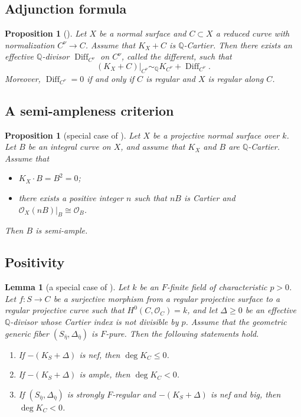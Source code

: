 \documentclass[10pt,abstract=true]{scrartcl}
\numberwithin{equation}{section}
\newtheorem{lemma}[theorem]{Lemma}
\newtheorem{proposition}[theorem]{Proposition}
\theoremstyle{definition}
\theoremstyle{remark}
\def\simQ{\sim_{\mathbb Q}} \def\geQ{\ge_{\mathbb Q}}
\begin{document}
\subsection{Adjunction formula}\label{sec:adjunction}%
\begin{proposition}[{\cite[Definition~2.34 and Proposition~2.35]{Kollar-Sing}}]\label{prop:adj}%
  Let $X$ be a normal surface and $C\subset X$ a reduced curve with normalization $C^\nu\to C$.
  Assume that $K_X + C$ is $\mathbb Q$-Cartier.
  Then there exists an effective $\mathbb Q$-divisor $\operatorname{Diff}_{C^\nu}$ on $C^\nu$, called the different, such that \[
        (K_X + C)|_{C^\nu} \simQ K_{C^\nu} + \operatorname{Diff}_{C^\nu}.
      \]
  Moreover, $\operatorname{Diff}_{C^\nu} = 0$ if and only if $C$ is regular and $X$ is regular along $C$.
\end{proposition}

\subsection{A semi-ampleness criterion}\label{sec:semi-ampleness}
\begin{proposition}[special case of {\cite[Proposition~3.1]{tanaka_abundance_2020}}]\label{prop:tanaka-abun-3.1}%
  Let $X$ be a projective normal surface over $k$.
  Let $B$ be an integral curve on $X$, and assume that $K_X$ and $B$ are $\mathbb Q$-Cartier.
  Assume that
  \begin{itemize}
    \item[\textup{(1)}] $K_X \cdot B = B^2 = 0$;
    \item[\textup{(2)}] there exists a positive integer $n$ such that $nB$ is Cartier and $\mathcal O_X(nB)|_B\cong\mathcal O_B$.
  \end{itemize}
  Then $B$ is semi-ample.
\end{proposition}


\subsection{Positivity}\label{sec:positivity}
\begin{lemma}[a special case of {\cite[Corollary~4.6]{Ejiri-2019}}]\label{lemm:Ejiri-base-curve}
  Let $k$ be an $F$-finite field of characteristic $p>0$.
  Let $f\colon S\to C$ be a surjective morphism from a regular projective surface to a regular projective curve such that $H^0(C,\mathcal O_C)=k$, and let $\Delta\ge0$ be an effective $\mathbb Q$-divisor whose Cartier index is not divisible by $p$.
  Assume that the geometric generic fiber $(S_{\bar\eta},\Delta_{\bar\eta})$ is $F$-pure.
  Then the following statements hold.
  \begin{enumerate}[label=\textup{(\arabic*)}]
    \item If $-(K_S+\Delta)$ is nef, then $\deg K_C \leq 0$.
    \item If $-(K_S+\Delta)$ is ample, then $\deg K_C < 0$.
    \item If $(S_{\bar\eta},\Delta_{\bar\eta})$ is strongly $F$-regular and $-(K_S+\Delta)$ is nef and big, then $\deg K_C < 0$.
  \end{enumerate}
\end{lemma}
\end{document}
